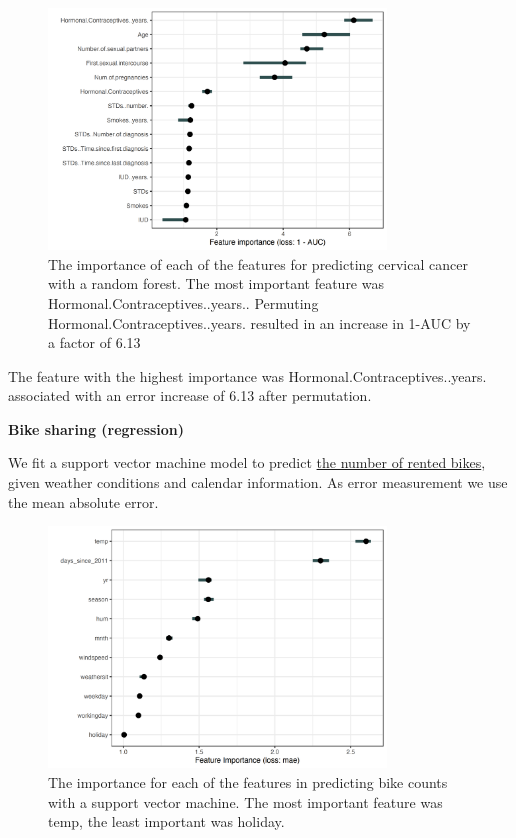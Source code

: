 \documentclass[
  10pt,
]{scrbook}
\begin{document}
\begin{figure}

{\centering \includegraphics[width=0.8\textwidth]{images/importance-cervical-1} 

}

\caption{The importance of each of the features for predicting cervical cancer with a random forest. The most important feature was Hormonal.Contraceptives..years.. Permuting Hormonal.Contraceptives..years. resulted in an increase in 1-AUC by a factor of 6.13}\label{fig:importance-cervical}
\end{figure}

The feature with the highest importance was Hormonal.Contraceptives..years. associated with an error increase of 6.13 after permutation.

\textbf{Bike sharing (regression)}

We fit a support vector machine model to predict \protect\hyperlink{bike-data}{the number of rented bikes}, given weather conditions and calendar information.
As error measurement we use the mean absolute error.

\begin{figure}

{\centering \includegraphics[width=0.8\textwidth]{images/importance-bike-1} 

}

\caption{The importance for each of the features in predicting bike counts with a support vector machine. The most important feature was temp, the least important was holiday.}\label{fig:importance-bike}
\end{figure}
\end{document}
